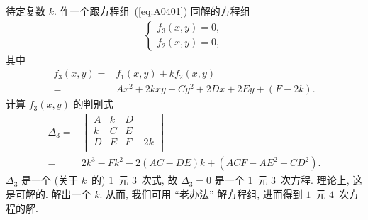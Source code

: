 \documentclass[%
    UTF8,%
    fontset=none,%
    punct=kaiming,%
    zihao=-4,%
    a4paper,%
    oneside,%
]{ctexbook}
\begin{document}
待定复数 \(k\).
作一个跟方程组~(\ref{eq:A0401}) 同解的方程组
\begin{align*}
    \begin{cases}
        f_3 (x, y) = 0, \\
        f_2 (x, y) = 0,
    \end{cases}
\end{align*}
其中
\begin{align*}
    f_3 (x, y)
    = {} & f_1 (x, y) + kf_2 (x, y)                   \\
    = {} & Ax^2 + 2kxy + Cy^2 + 2Dx + 2Ey + (F - 2k).
\end{align*}
计算 \(f_3 (x, y)\) 的判别式
\begin{align*}
    \Delta_3
    = {} & \begin{vmatrix}
               A & k & D    \\
               k & C & E    \\
               D & E & F-2k \\
           \end{vmatrix}                                 \\
    = {} & 2k^3 - Fk^2 - 2(AC-DE)k + (ACF - AE^2 - CD^2).
\end{align*}
\(\Delta_3\) 是一个 (关于 \(k\)~的) \(1\)~元 \(3\)~次式,
故 \(\Delta_3 = 0\) 是一个 \(1\)~元 \(3\)~次方程.
理论上, 这是可解的.
解出一个 \(k\).
从而, 我们可用 ``老办法'' 解方程组,
进而得到 \(1\)~元 \(4\)~次方程的解.
\end{document}
